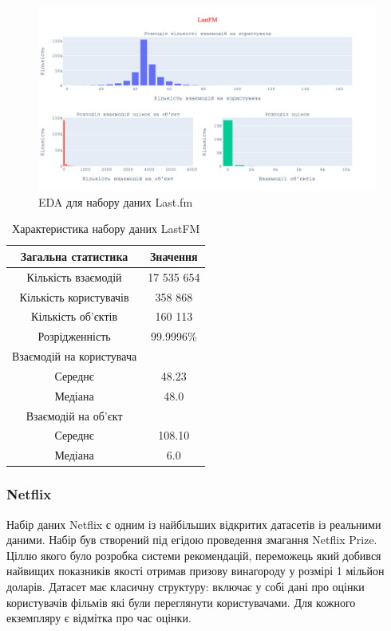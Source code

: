 \begin{figure}[H]
    \centering
    \includegraphics[width = 1\textwidth]{images/LastFM_stat.png}    
    \caption{EDA для набору даних Last.fm}
\end{figure}

\begin{table}[H]
    \centering
    \caption{Характеристика набору даних LastFM}
    \begin{tabular}{|c|c|}
        \hline
        Загальна статистика      & Значення \\ \hline
        Кількість взаємодій      & 17 535 654                    \\
        Кількість користувачів   & 358 868                        \\
        Кількість об’єктів       & 160 113                        \\
        Розрідженність           & 99.9996\%                    \\\hline
        Взаємодій на користувача &                              \\ \hline
        Середнє                  & 48.23                        \\
        Медіана                  & 48.0                         \\ \hline
        Взаємодій на об’єкт      &                              \\ \hline
        Середнє                  & 108.10                       \\
        Медіана                  & 6.0                        \\ \hline
    \end{tabular}

    \label{tab:LastFM}
\end{table}

\subsubsection{Netflix}
Набір даних Netflix є одним із найбільших відкритих датасетів із реальними даними. Набір був створений під егідою проведення змагання Netflix Prize. Ціллю якого було розробка системи рекомендацій, переможець який добився найвищих показників якості отримав призову винагороду у розмірі 1 мільйон доларів. Датасет має класичну структуру: включає у собі дані про оцінки користувачів фільмів які були переглянути користувачами. Для кожного екземпляру є відмітка про час оцінки. 

